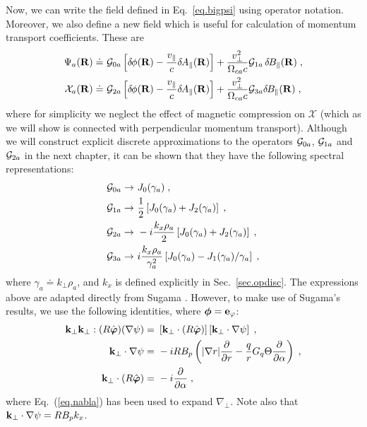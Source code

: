 Now, we can write the field defined in Eq.~\ref{eq.bigpsi} using operator 
notation.  Moreover, we also define a new field which is useful for 
calculation of momentum transport coefficients.  These are
%
\begin{align}
\Psi_a(\mathbf{R}) \doteq &~{\cal G}_{0a} \left[ \delta \hskip -1pt \phi(\mathbf{R}) - \frac{v_\parallel}{c} \delta \hskip -1pt A_\parallel(\mathbf{R}) \right]
 + \frac{v_\perp^2}{\Omega_{ca} c} {\cal G}_{1a} \, \delta \hskip -1pt B_\parallel(\mathbf{R}) \; , \\
\mathcal{X}_a(\mathbf{R}) \doteq &~{\cal G}_{2a} \left[ \delta \hskip -1pt \phi(\mathbf{R}) - \frac{v_\parallel}{c} \delta \hskip -1pt A_\parallel(\mathbf{R}) \right]
 + \frac{v_\perp^2}{\Omega_{ca} c} {\cal G}_{3a} \delta \hskip -1pt B_\parallel(\mathbf{R}) \; , 
\end{align}
%
where for simplicity we neglect the effect of magnetic compression
on $\mathcal{X}$ (which as we will show is connected with perpendicular 
momentum transport).  Although we will construct explicit discrete 
approximations to the operators ${\cal G}_{0a}$, ${\cal G}_{1a}$ and ${\cal G}_{2a}$
in the next chapter, it can be shown that they have the following 
spectral representations:
%
\begin{align}
{\cal G}_{0a} \rightarrow &~J_0(\gamma_a) \; , \\
{\cal G}_{1a} \rightarrow &~\frac{1}{2} \left[ 
  J_0(\gamma_a) + J_2(\gamma_a) \right] \; , \\
{\cal G}_{2a} \rightarrow &~-i \frac{k_x \rho_a}{2} \left[ 
  J_0(\gamma_a) + J_2(\gamma_a) \right] \; , \\
{\cal G}_{3a} \rightarrow &~i \frac{k_x \rho_a}{\gamma_a^2} \left[ 
  J_0(\gamma_a) - J_1(\gamma_a)/\gamma_a \right] \; ,
\end{align}
%
where $\gamma_a \doteq k_\perp \rho_a$, and $k_x$ is defined explicitly in 
Sec.~\ref{sec.opdisc}.  The expressions above are adapted directly from Sugama \cite{sugama:1998}.  
However, to make use of Sugama's results, we use the following identities, 
where $\boldsymbol{\phi} = \mathbf{e}_\varphi$:
%
\begin{align}
\mathbf{k}_\perp\mathbf{k}_\perp : (R\hat{\boldsymbol{\varphi}}) (\nabla\psi) 
 = &~ \left[ \mathbf{k}_\perp \cdot  (R\hat{\boldsymbol{\varphi}}) \right] 
      \left[ \mathbf{k}_\perp \cdot \nabla\psi \right] \; , \\
\mathbf{k}_\perp \cdot \nabla\psi = &~ -i R B_p \left( |\nabla r| \frac{\partial}{\partial r} 
- \frac{q}{r} G_q \Theta \frac{\partial}{\partial\alpha} \right) \; , \\
\mathbf{k}_\perp \cdot  (R\hat{\boldsymbol{\varphi}}) 
 = &~ -i \frac{\partial}{\partial\alpha} \; ,
\end{align}
% 
where Eq.~(\ref{eq.nabla}) has been used to expand $\nabla_\perp$.  Note also that 
$\mathbf{k}_\perp \cdot \nabla\psi = R B_p k_x$.

